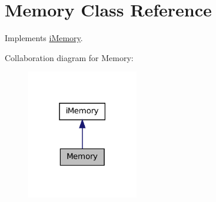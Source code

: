 \hypertarget{classMemory}{
\section{Memory Class Reference}
\label{classMemory}
}


Implements \hyperlink{classiMemory}{iMemory}.  




Collaboration diagram for Memory:\nopagebreak
\begin{figure}[H]
\begin{center}
\leavevmode
\includegraphics[width=138pt]{classMemory__coll__graph}
\end{center}
\end{figure}
